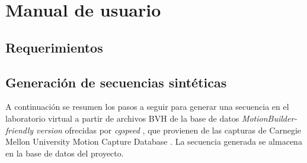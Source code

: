 \chapter{Manual de usuario}
\label{manualusuario}

\section{Requerimientos}

\section{Generación de secuencias sintéticas}

A continuación se resumen los pasos a seguir para generar una secuencia en el laboratorio virtual a partir de archivos BVH de la base de datos \textit{MotionBuilder-friendly version} ofrecidas por \textit{cgspeed} \cite{cgspeed}, 
 que provienen de las capturas de Carnegie Mellon University Motion Capture Database \cite{CMU}. La secuencia generada se almacena en la base de datos del proyecto.
 
